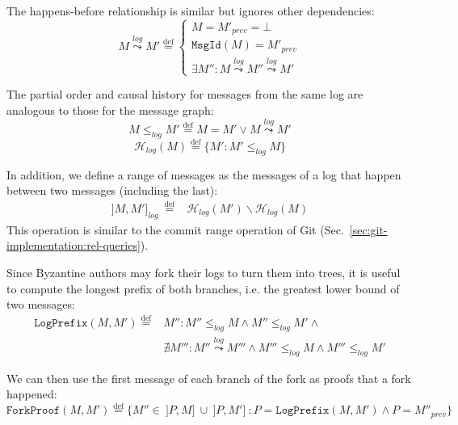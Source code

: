 \documentclass[9pt, oneside]{article}   	%
\newcommand{\defeq}{\overset{\mathrm{def}}{=}}
\newcommand{\anyleadsto}[1]{\overset{#1}\leadsto}
\newcommand{\logleadsto}{\overset{\textit{log}}\leadsto}
\begin{document}
The happens-before relationship is similar but ignores other dependencies:
\begin{equation}
	M \anyleadsto{\textit{log}} M' \defeq \begin{cases}
		M = M'_\textit{prev} = \bot \\
		\texttt{MsgId}(M) = M'_\textit{prev}  \\
		\exists M'' : M \anyleadsto{\textit{log}} M'' \logleadsto M'
	\end{cases}
\end{equation}

The partial order and causal history for messages from the same log are analogous to those for the message graph:
\begin{equation}
\label{eq:log-message:ordering}
	M \leq_\textit{log} M' \defeq M = M' \vee M \logleadsto M'
\end{equation}
\begin{equation}
	\mathcal{H}_\textit{log}(M) \defeq \{ M' : M' \leq_\textit{log} M \} 
\end{equation}

In addition, we define a range of messages as the messages of a log that happen between two messages (including the last):
\begin{eqnarray}
	]   M, M' ]_\textit{log}~ \defeq &  \mathcal{H}_\textit{log}(M') \backslash \mathcal{H}_\textit{log}(M) 
\end{eqnarray}
This operation is similar to the commit range operation of Git (Sec.~\ref{sec:git-implementation:rel-queries}).

Since Byzantine authors may fork their logs to turn them into trees, it is useful to compute the longest prefix of both branches, i.e. the greatest lower bound of two messages:
\begin{equation}
\label{eq:log-message:log-prefix}
\begin{split}
	\texttt{LogPrefix}(M,M') \defeq & M'' : M'' \leq_\textit{log} M \wedge M'' \leq_\textit{log} M' \wedge \\
	 & \nexists M''' : M'' \logleadsto M''' \wedge M''' \leq_\textit{log} M \wedge M''' \leq_\textit{log} M'
\end{split}
\end{equation}

We can then use the first message of each branch of the fork as proofs that a fork happened:
\begin{equation}
 	\texttt{ForkProof}(M, M') \defeq \{ M'' \in ~] P, M ] ~\cup~ ] P, M' ]~: P = \texttt{LogPrefix}(M, M') \wedge P = M''_\textit{prev} \}
\end{equation}
\end{document}
